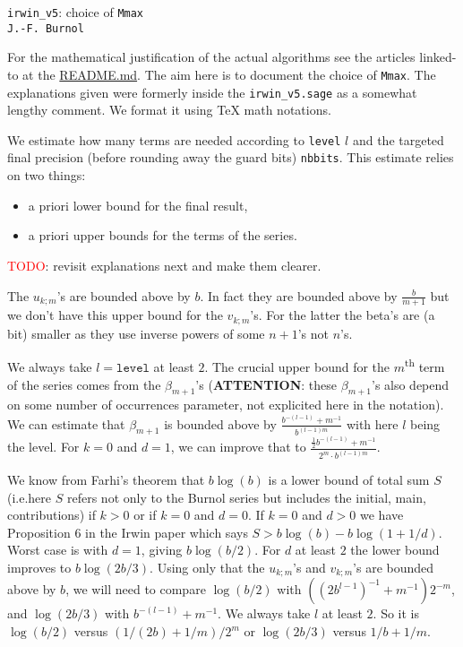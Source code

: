 \documentclass[a4paper,french,dvipdfmx,11pt]{article}
\begin{document}
\begin{center}
  \Large \texttt{irwin\_v5}: choice of \texttt{Mmax}
\\
\smallskip
\normalsize
\texttt{J.-F. Burnol \timestamp}\par
\end{center}

For the mathematical justification of the actual algorithms see the articles
linked-to at the
\href{https://gitlab.com/burnolmath/irwin/-/blob/master/README.md}{README.md}.
The aim here is to document the choice of \texttt{Mmax}.  The explanations
given were formerly inside the \texttt{irwin\_v5.sage} as a somewhat
lengthy comment.  We format it using \TeX{} math notations.

We estimate how many terms are needed according to \texttt{level} $l$ and the
targeted final precision (before rounding away the guard bits)
\texttt{nbbits}. This estimate relies on two things:
\begin{itemize}[noitemsep]
\item a priori lower bound for the final result,
\item a priori upper bounds for the terms of the series.
\end{itemize}

\textcolor{red}{TODO}: revisit explanations next and make them clearer.

\linespread{1.2}\selectfont

The $u_{k;m}$'s are bounded above by $b$. In fact they are bounded above by
$\frac{b}{m+1}$ but we don't have this upper bound for the $v_{k;m}$'s.  For
the latter the beta's are (a bit) smaller as they use inverse powers of some $n+1$'s
not $n$'s.

We always take $l=\mathtt{level}$ at least $2$.  The crucial upper bound for
the $m$\textsuperscript{th} term of the series comes from the $\beta_{m+1}$'s
(\textbf{ATTENTION}: these $\beta_{m+1}$'s also depend on some number of
occurrences parameter, not explicited here in the notation).%
%
%
  We can estimate
that $\beta_{m+1}$ is bounded above
 by $\frac{b^{-(l-1)} +
  m^{-1}}{b^{(l-1)m}}$ with here $l$ being the level.  For $k=0$ and $d=1$, we
can improve that to $\frac{\frac12 b^{-(l-1)}+m^{-1}}{2^m\cdot b^{(l-1)m}}$.

We know from Farhi's theorem that $b\log(b)$ is a lower bound of total sum $S$
(i.e.\@ here $S$ refers not only to the Burnol series but includes the initial, main,
contributions) if $k>0$ or if $k=0$ and $d=0$.  If
$k=0$ and $d>0$ we have Proposition 6 in the Irwin paper which says $S >
b\log(b) -b\log(1+1/d)$. Worst case is with $d=1$, giving $b\log(b/2)$. For
$d$ at least $2$ the lower bound improves to $b\log(2b/3)$. Using only that
the $u_{k;m}$'s and $v_{k;m}$'s are bounded above by $b$, we will need to
compare $\log(b/2)$ with $((2b^{l-1})^{-1}+m^{-1})2^{-m}$, and $\log(2b/3)$
with $b^{-(l-1)} + m^{-1}$.  We always take $l$ at least $2$.  So it is
$\log(b/2)$ versus $(1/(2b)+1/m)/2^m$ or $\log(2b/3)$ versus $1/b + 1/m$.
\end{document}
